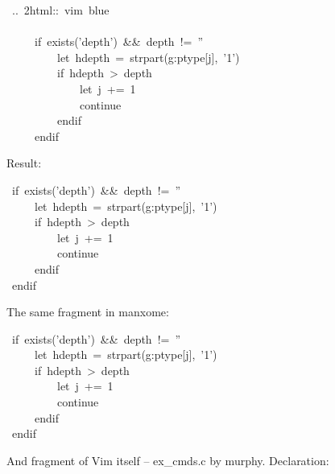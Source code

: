 \documentclass[12pt]{article}
\begin{document}
\begin{ttfamily}\begin{flushleft}
\mbox{~..~2html::~vim~blue}\\
\mbox{}\\
\mbox{~~~~~if~exists('depth')~\&\&~depth~!=~''}\\
\mbox{~~~~~~~~~let~hdepth~=~strpart(g:ptype[j],~'1')}\\
\mbox{~~~~~~~~~if~hdepth~>~depth}\\
\mbox{~~~~~~~~~~~~~let~j~+=~1}\\
\mbox{~~~~~~~~~~~~~continue}\\
\mbox{~~~~~~~~~endif}\\
\mbox{~~~~~endif}\\
\end{flushleft}\end{ttfamily}

Result:

\begin{ttfamily}\begin{flushleft}
\mbox{~if~exists('depth')~\&\&~depth~!=~''}\\
\mbox{~~~~~let~hdepth~=~strpart(g:ptype[j],~'1')}\\
\mbox{~~~~~if~hdepth~>~depth}\\
\mbox{~~~~~~~~~let~j~+=~1}\\
\mbox{~~~~~~~~~continue}\\
\mbox{~~~~~endif}\\
\mbox{~endif}\\
\end{flushleft}\end{ttfamily}

The same fragment in manxome:

\begin{ttfamily}\begin{flushleft}
\mbox{~if~exists('depth')~\&\&~depth~!=~''}\\
\mbox{~~~~~let~hdepth~=~strpart(g:ptype[j],~'1')}\\
\mbox{~~~~~if~hdepth~>~depth}\\
\mbox{~~~~~~~~~let~j~+=~1}\\
\mbox{~~~~~~~~~continue}\\
\mbox{~~~~~endif}\\
\mbox{~endif}\\
\end{flushleft}\end{ttfamily}

And fragment of Vim itself -- ex\_cmds.c by murphy. Declaration:
\end{document}
